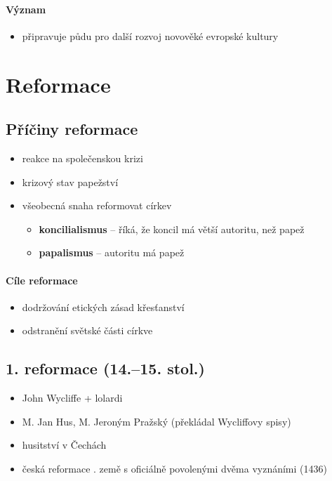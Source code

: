 \paragraph{Význam}
\begin{itemize}
\item připravuje půdu pro další rozvoj novověké evropské kultury
\end{itemize}

\newpage
\section{Reformace}
\subsection{Příčiny reformace}
\begin{itemize}
\item reakce na společenskou krizi
\item krizový stav papežství 
\item všeobecná snaha reformovat církev
	\begin{itemize}
	\item \textbf{koncilialismus} -- říká, že koncil má větší autoritu, než papež
	\item \textbf{papalismus} -- autoritu má papež
	\end{itemize}
\end{itemize}

\paragraph{Cíle reformace}
\begin{itemize}
\item dodržování etických zásad křesťanství
\item odstranění světské části církve
\end{itemize}

\subsection{1. reformace (14.--15. stol.)}
\begin{itemize}
\item John Wycliffe + lolardi
\item M. Jan Hus, M. Jeroným Pražský (překládal Wycliffovy spisy)
\item husitství v Čechách
\item česká reformace . země s oficiálně povolenými dvěma vyznáními (1436)
\end{itemize}

